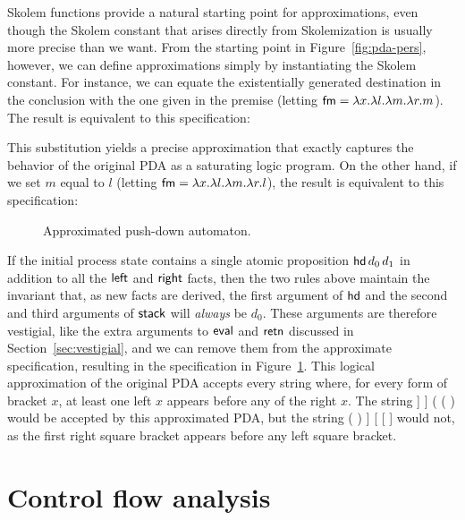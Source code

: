Skolem functions provide a natural starting point for approximations,
even though the Skolem constant that arises directly from
Skolemization is usually more precise than we want. From the starting
point in Figure~\ref{fig:pda-pers}, however, we can define
approximations simply by instantiating the Skolem constant.  For
instance, we can equate the existentially generated destination in the
conclusion with the one given in the premise (letting ${\sf fm} =
\lambda x. \lambda l. \lambda m. \lambda r. m$). The result is
equivalent to this specification:

\smallskip
{}
\smallskip

\noindent This substitution yields a precise approximation
that exactly captures the behavior of the original PDA as a saturating
logic program. On the other hand, if we set $m$ equal to $l$ 
(letting ${\sf fm} = \lambda x. \lambda l. \lambda m. \lambda r. l$), 
the result is equivalent to this specification:

\smallskip
{}
\smallskip

\begin{figure}
\caption{Approximated push-down automaton.}
\label{fig:pda-pers-approx2}
\end{figure}

If the initial process state contains a single atomic proposition
${\sf hd}\,d_0\,d_1$ in addition to all the ${\sf left}$ and ${\sf
  right}$ facts, then the two rules above maintain the invariant that,
as new facts are derived, the first argument of ${\sf hd}$ and the
second and third arguments of ${\sf stack}$ will {\it always} be
$d_0$.  These arguments are therefore vestigial, like the extra
arguments to ${\sf eval}$ and ${\sf retn}$ discussed in
Section~\ref{sec:vestigial}, and we can remove them from the
approximate specification, resulting in the specification in
Figure~\ref{fig:pda-pers-approx2}. This logical approximation of the
original PDA accepts every string where, for every form of bracket
$x$, at least one left $x$ appears before any of the right $x$. The
string {\sf [ ] ] ] ( ( )} would be accepted by this approximated PDA,
but the string {\sf ( ) ] [ [ ]} would not, as the first right square
bracket appears before any left square bracket.


\section{Control flow analysis}
\label{sec:0cfa}

